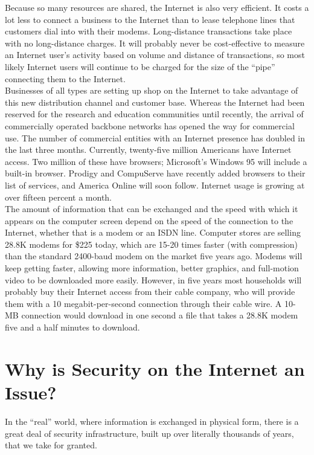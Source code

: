 Because so many resources are shared, the Internet is also very
efficient. It costs a lot less to connect a business to the Internet
than to lease telephone lines that customers dial into with their
modems. Long-distance transactions take place with no long-distance
charges. It will probably never be cost-effective to measure an
Internet user's activity based on volume and distance of transactions,
so most likely Internet users will continue to be charged for the size
of the ``pipe'' connecting them to the Internet.\\

Businesses of all types are setting up shop on the Internet to take
advantage of this new distribution channel and customer base. Whereas
the Internet had been reserved for the research and education
communities until recently, the arrival of commercially operated
backbone networks has opened the way for commercial use. The number of
commercial entities with an Internet presence has doubled in the last
three months. Currently, twenty-five million Americans have Internet
access. Two million of these have browsers; Microsoft's Windows 95 will
include a built-in browser. Prodigy and CompuServe have recently added
browsers to their list of services, and America Online will soon
follow. Internet usage is growing at over fifteen percent a month.\\

The amount of information that can be exchanged and the speed with
which it appears on the computer screen depend on the speed of the
connection to the Internet, whether that is a modem or an ISDN line.
Computer stores are selling 28.8K modems for \$225 today, which are
15-20 times faster (with compression) than the standard 2400-baud modem
on the market five years ago. Modems will keep getting faster, allowing
more information, better graphics, and full-motion video to be
downloaded more easily. However, in five years most households will
probably buy their Internet access from their cable company, who will
provide them with a 10 megabit-per-second connection through their
cable wire. A 10-MB connection would download in one second a file that
takes a 28.8K modem five and a half minutes to download.\\

\section{Why is Security on the Internet an Issue?}
In the ``real'' world, where information is exchanged in physical form,
there is a great deal of security infrastructure, built up over
literally thousands of years, that we take for granted.\\

